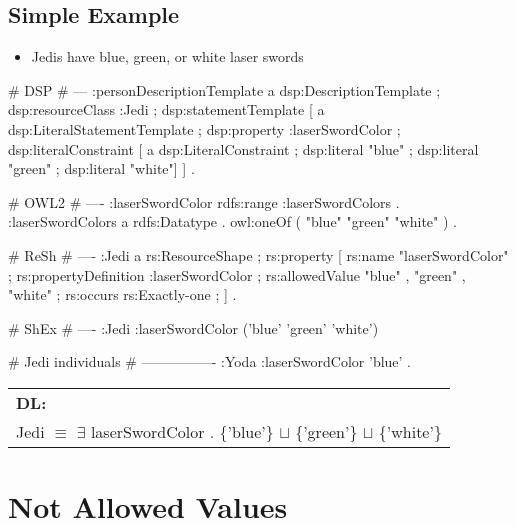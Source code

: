\documentclass{llncs}
\newenvironment{DL}{
  \scriptsize
  \sffamily
  \vspace{0.3cm}
  \begin{tabular}{l}
	\textbf{DL:} \\

}{
  \end{tabular}
  \linebreak
}
\newcommand{\tb}[1]{\todo[size=\small, color=blue!40]{\textbf{Thomas:} #1}}
\begin{document}
\subsection{Simple Example}

\begin{itemize}
	\item Jedis have blue, green, or white laser swords
\end{itemize}

\begin{ex}
# DSP
# ---
:personDescriptionTemplate
    a dsp:DescriptionTemplate ;
    dsp:resourceClass :Jedi ;
    dsp:statementTemplate [
        a dsp:LiteralStatementTemplate ;
        dsp:property :laserSwordColor ;
        dsp:literalConstraint [
            a dsp:LiteralConstraint ;
            dsp:literal "blue" ;
            dsp:literal "green" ;
            dsp:literal "white"] ] .
\end{ex}

\begin{ex}
# OWL2
# ----
:laserSwordColor rdfs:range :laserSwordColors . 
:laserSwordColors
    a rdfs:Datatype .
    owl:oneOf ( "blue" "green" "white" ) .
\end{ex}

\begin{ex}
# ReSh
# ----
:Jedi a rs:ResourceShape ;
    rs:property [
        rs:name "laserSwordColor" ;
        rs:propertyDefinition :laserSwordColor ;
        rs:allowedValue "blue" , "green" , "white" ;
        rs:occurs rs:Exactly-one ;
    ] .
\end{ex}

\begin{ex}
# ShEx
# ----
:Jedi {
    :laserSwordColor ('blue' 'green' 'white') }
\end{ex}

\begin{ex}
# Jedi individuals
# ----------------
:Yoda 
    :laserSwordColor 'blue' .
\end{ex}

\begin{DL}
Jedi $\equiv$ $\exists$ laserSwordColor . \{'blue'\} $\sqcup$ \{'green'\} $\sqcup$ \{'white'\} \\
\end{DL}

\tb{ToDo: check DL}

\section{Not Allowed Values}
\end{document}
